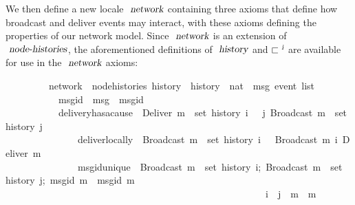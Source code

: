 We then define a new locale $\isa{network}$ containing three axioms that define how broadcast and deliver events may interact, with these axioms defining the properties of our network model.
Since $\isa{network}$ is an extension of $\isa{node-histories}$, the aforementioned definitions of $\isa{history}$ and $\sqsubset^\isa{i}$ are available for use in the $\isa{network}$ axioms:
\vspace{0.35em}
\begin{isabellebody}
\ \ \ \ \ \ \ \ \ network\ {\isacharequal}\ node{\isacharunderscore}histories\ history\ \ history\ {\isacharcolon}{\isacharcolon}\ {\isachardoublequoteopen}nat\ {\isasymRightarrow}\ {\isacharprime}msg\ event\ list{\isachardoublequoteclose}\ {\isacharplus}\isanewline
\ \ \ \ \ \ \ \ \ \ \ msg{\isacharunderscore}id\ {\isacharcolon}{\isacharcolon}\ {\isachardoublequoteopen}{\isacharprime}msg\ {\isasymRightarrow}\ {\isacharprime}msgid{\isachardoublequoteclose}\isanewline
\ \ \ \ \ \ \ \ \ \ \ delivery{\isacharunderscore}has{\isacharunderscore}a{\isacharunderscore}cause{\isacharcolon}\ {\isasymlbrakk}\ {\isachardoublequoteopen}Deliver\ m\ {\isasymin}\ set\ {\isacharparenleft}history\ i{\isacharparenright}\ {\isasymrbrakk}\ {\isasymLongrightarrow}\ {\isasymexists}j{\isachardot}\ Broadcast\ m\ {\isasymin}\ set\ {\isacharparenleft}history\ j{\isacharparenright}{\isachardoublequoteclose}\isanewline
\ \ \ \ \ \ \ \ \ \ \ \ \ \ \ deliver{\isacharunderscore}locally{\isacharcolon}\ {\isasymlbrakk}\ {\isachardoublequoteopen}Broadcast\ m\ {\isasymin}\ set\ {\isacharparenleft}history\ i{\isacharparenright}\ {\isasymrbrakk}\ {\isasymLongrightarrow}\  Broadcast\ m\ {\isasymsqsubset}\isactrlsup i\ Deliver\ m{\isachardoublequoteclose}\isanewline
\ \ \ \ \ \ \ \ \ \ \ \ \ \ \ msg{\isacharunderscore}id{\isacharunderscore}unique{\isacharcolon}\ {\isasymlbrakk}\ {\isachardoublequoteopen}Broadcast\ m{}\ {\isasymin}\ set\ {\isacharparenleft}history\ i{\isacharparenright};\ Broadcast\ m{}\ {\isasymin}\ set\ {\isacharparenleft}history\ j{\isacharparenright};\ msg{\isacharunderscore}id\ m{}\ {\isacharequal}\ msg{\isacharunderscore}id\ m{}\ {\isasymrbrakk}\isanewline
\ \ \ \ \ \ \ \ \ \ \ \ \ \ \ \ \ \ \ \ \ \ \ \ \ \ \ \ \ \ \ \ \ \ \ \ \ \ \ \ \ \ \ \ \ \ \ \ \ \ \ \ \ {\isasymLongrightarrow}\ i\ {\isacharequal}\ j\ {\isasymand}\ m{}\ {\isacharequal}\ m{}{\isachardoublequoteclose}
\end{isabellebody}

